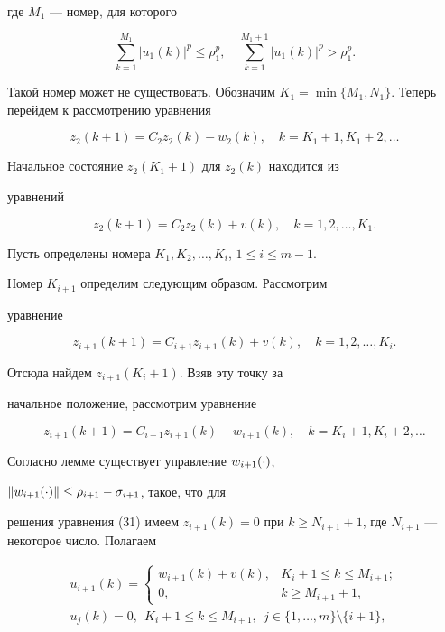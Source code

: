 где $M_1$ --- номер, для которого


$$


\sum\limits_{k=1}^{M_1} |u_1(k)|^p \leq \rho_1^p, \quad


\sum\limits_{k=1}^{M_1+1} |u_1(k)|^p > \rho_1^p.


$$


Такой номер может не существовать. Обозначим $K_1 = \min\{M_1, 


N_1 \}$. Теперь перейдем к рассмотрению уравнения


$$


z_2(k+1) = C_2z_2(k) - w_2(k), \quad k=K_1+1, K_1+2, \dotsc


$$


Начальное состояние $z_2(K_1+1) $ для $z_2(k) $ находится из


уравнений


$$


z_2(k+1) = C_2z_2(k) + v(k), \quad k=1, 2, \dotsc, K_1.


$$


Пусть определены номера $K_1, K_2, \dotsc, K_i$, $1 \leq i \leq m-1$.


Номер $K_{i+1}$ определим следующим образом. Рассмотрим


уравнение


$$


z_{i+1}(k+1) = C_{i+1}z_{i+1}(k) + v(k), \quad k=1, 2, \dotsc, K_i.


$$


Отсюда найдем $z_{i+1}(K_i+1)$. Взяв эту точку за


начальное положение, рассмотрим уравнение


\begin{equation}


z_{i+1}(k+1) = C_{i+1}z_{i+1}(k) - w_{i+1}(k), \quad


k=K_i+1, K_i+2, \dotsc


\end{equation}


Согласно лемме существует управление $w_{i+1}(\cdot)$,


$\|w_{i+1}(\cdot)\| \leq \rho_{i+1} - \sigma_{i+1}$, такое, что для


решения уравнения (31) имеем $z_{i+1}(k) = 0$ при $k \geq


N_{i+1}+1$, где $N_{i+1}$ --- некоторое число. Полагаем


\begin{gather*}


u_{i+1}(k) =


\begin{cases}


w_{i+1}(k) + v(k), & K_i+1 \leq k \leq M_{i+1}; \\


0, & k \geq M_{i+1} +1, 


\end{cases}


\\


u_j(k) = 0,\ \ K_i+1 \leq k \leq M_{i+1},\ \ j \in \{1,\dotsc,m\} \setminus


\{{i+1}\},


\end{gather*}


